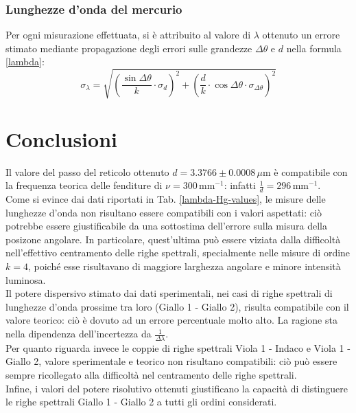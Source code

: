 \documentclass[]{article}
\let\oldsection\section%
\renewcommand{\section}{%
	\renewcommand{\theequation}{\thesection.\arabic{equation}}%
	\oldsection}%
\begin{document}
    \subsubsection{Lunghezze d'onda del mercurio}
    Per ogni misurazione effettuata, si è attribuito al valore di $\lambda$ ottenuto un errore stimato mediante propagazione degli errori sulle grandezze $\Delta \theta$ e $d$ nella formula \ref{lambda}:
    \begin{equation}
        \label{lambda-error}
        \sigma_{\lambda} = \sqrt{\left( \frac{\sin{\Delta\theta}}{k}  \cdot \sigma_d \right)^2 + \left(\frac{d}{k} \cdot \cos{\Delta\theta} \cdot \sigma_{\Delta\theta}\right)^2  } 
    \end{equation}
    \label{par:errore_lambda}

    \section{Conclusioni}
    Il valore del passo del reticolo ottenuto $d = 3.3766 \pm 0.0008 \,\mu\text{m}$ è compatibile con la frequenza teorica delle fenditure di $\nu = 300 \,\text{mm}^{-1}$: infatti $\frac{1}{d} = 296 \,\text{mm}^{-1}$.\\
    Come si evince dai dati riportati in Tab. \ref{lambda-Hg-values}, le misure delle lunghezze d'onda non risultano essere compatibili con i valori aspettati: ciò potrebbe essere giustificabile da una sottostima dell'errore sulla misura della posizone angolare. In particolare, quest'ultima può essere viziata dalla difficoltà nell'effettivo centramento delle righe spettrali, specialmente nelle misure di ordine $k = 4$, poiché esse risultavano di maggiore larghezza angolare e minore intensità luminosa.\\
    Il potere dispersivo stimato dai dati sperimentali, nei casi di righe spettrali di lunghezze d'onda prossime tra loro (Giallo 1 - Giallo 2), risulta compatibile con il valore teorico: ciò è dovuto ad un errore percentuale molto alto. La ragione sta nella dipendenza dell'incertezza da $\frac{1}{\Delta\lambda}$. \\
    Per quanto riguarda invece le coppie di righe spettrali Viola 1 - Indaco e Viola 1 - Giallo 2, valore sperimentale e teorico non risultano compatibili: ciò può essere sempre ricollegato alla difficoltà nel centramento delle righe spettrali. \\
    Infine, i valori del potere risolutivo ottenuti giustificano la capacità di distinguere le righe spettrali Giallo 1 - Giallo 2 a tutti gli ordini considerati.
\end{document}
